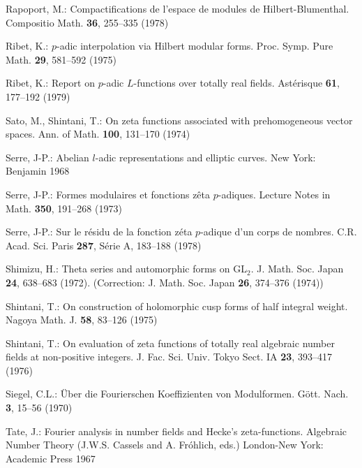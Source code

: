 \documentclass[12pt,a4paper]{article}
\theoremstyle{plain}
\theoremstyle{definition}
\theoremstyle{remark}
\begin{document}
\begin{enumerate}[label={[\arabic*]}, leftmargin=*, itemsep=0.5ex]
\item Rapoport, M.: Compactifications de l'espace de modules de Hilbert-Blumenthal. Compositio Math. \textbf{36}, 255--335 (1978)

\item Ribet, K.: $p$-adic interpolation via Hilbert modular forms. Proc. Symp. Pure Math. \textbf{29}, 581--592 (1975)

\item Ribet, K.: Report on $p$-adic $L$-functions over totally real fields. Ast\'{e}risque \textbf{61}, 177--192 (1979)

\item Sato, M., Shintani, T.: On zeta functions associated with prehomogeneous vector spaces. Ann. of Math. \textbf{100}, 131--170 (1974)

\item Serre, J-P.: Abelian $l$-adic representations and elliptic curves. New York: Benjamin 1968

\item Serre, J-P.: Formes modulaires et fonctions z\^{e}ta $p$-adiques. Lecture Notes in Math. \textbf{350}, 191--268 (1973)

\item Serre, J-P.: Sur le r\'{e}sidu de la fonction z\'{e}ta $p$-adique d'un corps de nombres. C.R. Acad. Sci. Paris \textbf{287}, S\'{e}rie A, 183--188 (1978)

\item Shimizu, H.: Theta series and automorphic forms on GL$_2$. J. Math. Soc. Japan \textbf{24}, 638--683 (1972). (Correction: J. Math. Soc. Japan \textbf{26}, 374--376 (1974))

\item Shintani, T.: On construction of holomorphic cusp forms of half integral weight. Nagoya Math. J. \textbf{58}, 83--126 (1975)

\item Shintani, T.: On evaluation of zeta functions of totally real algebraic number fields at non-positive integers. J. Fac. Sci. Univ. Tokyo Sect. IA \textbf{23}, 393--417 (1976)

\item Siegel, C.L.: \"{U}ber die Fourierschen Koeffizienten von Modulformen. G\"{o}tt. Nach. \textbf{3}, 15--56 (1970)

\item Tate, J.: Fourier analysis in number fields and Hecke's zeta-functions. Algebraic Number Theory (J.W.S. Cassels and A. Fr\'{o}hlich, eds.) London-New York: Academic Press 1967


\end{enumerate}
\end{document}
